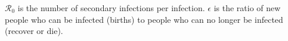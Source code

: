 ${\mathcal R_0}$ is the number of secondary infections per infection.
$\epsilon$ is the ratio of new people who can be infected (births) to people who can no longer be infected (recover or die).
